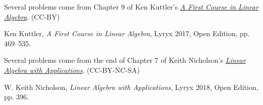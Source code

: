 \documentclass{ximera}
\begin{document}
Several problems come from Chapter 9 of Ken Kuttler's \href{https://open.umn.edu/opentextbooks/textbooks/a-first-course-in-linear-algebra-2017}{\it A First Course in Linear Algebra}. (CC-BY)

Ken Kuttler, {\it  A First Course in Linear Algebra}, Lyryx 2017, Open Edition, pp. 469--535.

Several problems come from the end of Chapter 7 of Keith Nicholson's \href{https://open.umn.edu/opentextbooks/textbooks/linear-algebra-with-applications}{\it Linear Algebra with Applications}. (CC-BY-NC-SA)

W. Keith Nicholson, {\it Linear Algebra with Applications}, Lyryx 2018, Open Edition, pp. 396. 
\end{document}

